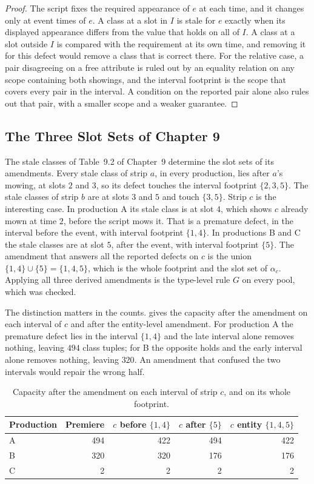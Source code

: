 \documentclass[11pt,twoside,openright]{book}
\theoremstyle{plain}
\theoremstyle{definition}
\theoremstyle{remark}
\begin{document}
\begin{proof}
The script fixes the required appearance of $e$ at each time, and it changes only at event times of $e$. A class at a slot in $I$ is stale for $e$ exactly when its displayed appearance differs from the value that holds on all of $I$. A class at a slot outside $I$ is compared with the requirement at its own time, and removing it for this defect would remove a class that is correct there. For the relative case, a pair disagreeing on a free attribute is ruled out by an equality relation on any scope containing both showings, and the interval footprint is the scope that covers every pair in the interval. A condition on the reported pair alone also rules out that pair, with a smaller scope and a weaker guarantee.
\end{proof}

\subsection{The Three Slot Sets of Chapter 9}

The stale classes of Table~9.2 of Chapter~9 determine the slot sets of its amendments. Every stale class of strip $a$, in every production, lies after $a$'s mowing, at slots $2$ and $3$, so its defect touches the interval footprint $\{2,3,5\}$. The stale classes of strip $b$ are at slots $3$ and $5$ and touch $\{3,5\}$. Strip $c$ is the interesting case. In production A its stale class is at slot $4$, which shows $c$ already mown at time $2$, before the script mows it. That is a premature defect, in the interval before the event, with interval footprint $\{1,4\}$. In productions B and C the stale classes are at slot $5$, after the event, with interval footprint $\{5\}$. The amendment that answers all the reported defects on $c$ is the union $\{1,4\}\cup\{5\}=\{1,4,5\}$, which is the whole footprint and the slot set of $\alpha_c$. Applying all three derived amendments is the type-level rule $G$ on every pool, which was checked.

The distinction matters in the counts.  gives the capacity after the amendment on each interval of $c$ and after the entity-level amendment. For production A the premature defect lies in the interval $\{1,4\}$ and the late interval alone removes nothing, leaving $494$ class tuples; for B the opposite holds and the early interval alone removes nothing, leaving $320$. An amendment that confused the two intervals would repair the wrong half.

\begin{table}[ht]
\centering
\begin{tabular}{@{}lrrrr@{}}
\toprule
Production & Premiere & $c$ before $\{1,4\}$ & $c$ after $\{5\}$ & $c$ entity $\{1,4,5\}$\\
\midrule
A & 494 & 422 & 494 & 422\\
B & 320 & 320 & 176 & 176\\
C & 2 & 2 & 2 & 2\\
\bottomrule
\end{tabular}
\caption{Capacity after the amendment on each interval of strip $c$, and on its whole footprint.}\label{tab:levels}
\end{table}
\end{document}
